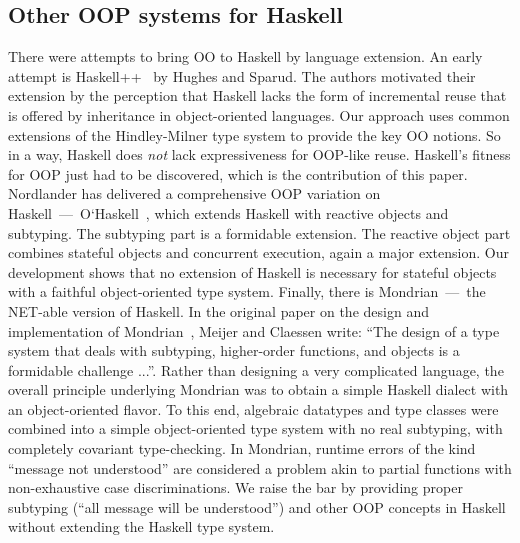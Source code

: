 \subsection*{Other OOP systems for Haskell}
There were attempts to bring OO to Haskell by language extension. An
early attempt is Haskell++~\cite{HS95} by Hughes and Sparud. The
authors motivated their extension by the perception that Haskell lacks
the form of incremental reuse that is offered by inheritance in
object-oriented languages. Our approach uses common extensions of the
Hindley-Milner type system to provide the key OO notions.  So in a
way, Haskell does \emph{not} lack expressiveness for OOP-like
reuse. Haskell's fitness for OOP just had to be discovered, which is
the contribution of this paper. Nordlander has delivered a
comprehensive OOP variation on
Haskell~---~O`Haskell~\cite{Nordlander98,Nordlander02}, which extends
Haskell with reactive objects and subtyping. The subtyping part is a
formidable extension. The reactive object part combines stateful
objects and concurrent execution, again a major extension. Our
development shows that no extension of Haskell is necessary for
stateful objects with a faithful object-oriented type system. Finally,
there is Mondrian~---~the NET-able version of Haskell. In the original
paper on the design and implementation of Mondrian~\cite{MC97}, Meijer
and Claessen write: ``The design of a type system that deals with
subtyping, higher-order functions, and objects is a formidable
challenge ...''. Rather than designing a very complicated language,
the overall principle underlying Mondrian was to obtain a simple
Haskell dialect with an object-oriented flavor. To this end, algebraic
datatypes and type classes were combined into a simple object-oriented
type system with no real subtyping, with completely covariant
type-checking. In Mondrian, runtime errors of the kind ``message not
understood'' are considered a problem akin to partial functions with
non-exhaustive case discriminations. We raise the bar by providing
proper subtyping (``all message will be understood'') and other OOP
concepts in Haskell without extending the Haskell type system.







